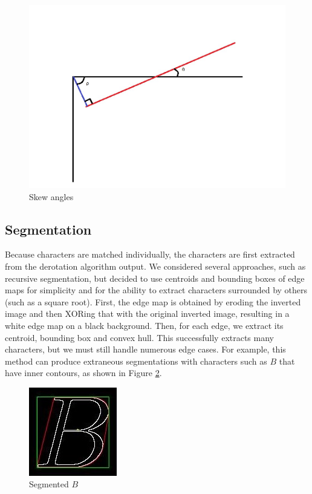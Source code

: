 \documentclass[journal]{IEEEtran}
\begin{document}
 
 
\begin{figure}[!t]
    \centering
    \includegraphics[width=\columnwidth]{fig3}
    \caption{Skew angles}
    \label{fig:3}
\end{figure}
 
\subsection{Segmentation}
Because characters are matched individually, the characters are first extracted from the derotation algorithm output. We considered several approaches, such as recursive segmentation\cite{Naqvi:article_typical}, but decided to use centroids and bounding boxes of edge maps for simplicity and for the ability to extract characters surrounded by others (such as a square root).
First, the edge map is obtained by eroding the inverted image and then XORing that with the original inverted image, resulting in a white edge map on a black background. Then, for each edge, we extract its centroid, bounding box and convex hull. This successfully extracts many characters, but we must still handle numerous edge cases. For example, this method can produce extraneous segmentations with characters such as $B$ that have inner contours, as shown in Figure \ref{fig:B}.

\begin{figure}[!t]
    \centering
    \includegraphics{B}
    \caption{Segmented $B$}
    \label{fig:B}
\end{figure}
\end{document}
